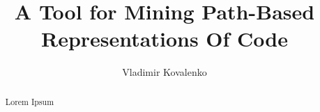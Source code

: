 \documentclass[sigconf]{acmart}
\begin{document}
\title{A Tool for Mining Path-Based Representations Of Code}


\author{Vladimir Kovalenko}


\begin{abstract}
Lorem Ipsum
\end{abstract}

\maketitle

% 




\end{document}
